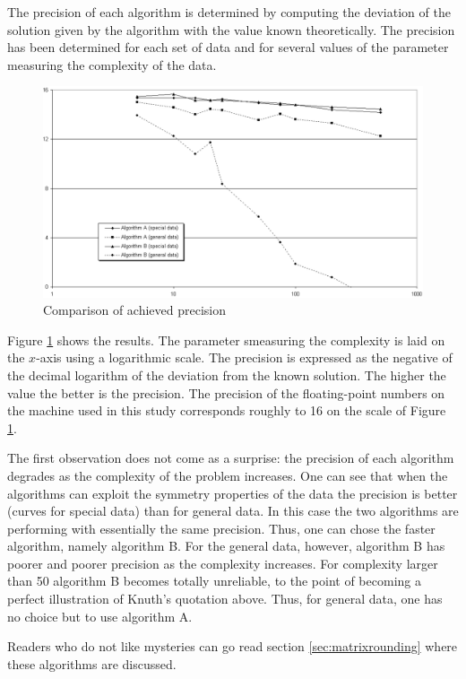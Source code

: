 The precision of each algorithm is determined by computing the
deviation of the solution given by the algorithm with the value
known theoretically. The precision has been determined for each
set of data and for several values of the parameter measuring the
complexity of the data.

\begin{figure}
\centering\includegraphics[width=12cm]{Figures/Precision}
\caption{Comparison of achieved precision} \label{fig:precision}
\end{figure}
Figure \ref{fig:precision} shows the results. The parameter
smeasuring the complexity is laid on the $x$-axis using a
logarithmic scale. The precision is expressed as the negative of
the decimal logarithm of the deviation from the known solution.
The higher the value the better is the precision. The precision of
the floating-point numbers on the machine used in this study
corresponds roughly to 16 on the scale of Figure
\ref{fig:precision}.

The first observation does not come as a surprise: the precision
of each algorithm degrades as the complexity of the problem
increases. One can see that when the algorithms can exploit the
symmetry properties of the data the precision is better (curves
for special data) than for general data. In this case the two
algorithms are performing with essentially the same precision.
Thus, one can chose the faster algorithm, namely algorithm B. For
the general data, however, algorithm B has poorer and poorer
precision as the complexity increases. For complexity larger than
50 algorithm B becomes totally unreliable, to the point of
becoming a perfect illustration of Knuth's quotation above. Thus,
for general data, one has no choice but to use algorithm A.

Readers who do not like mysteries can go read section
\ref{sec:matrixrounding} where these algorithms are discussed.

